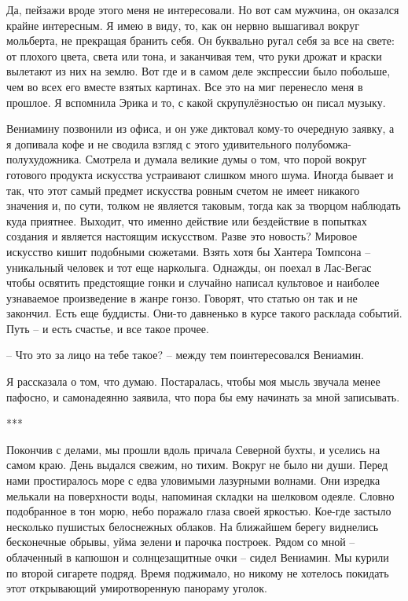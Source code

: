 \documentclass[
]{book}
\begin{document}
Да, пейзажи вроде этого меня не интересовали. Но вот сам мужчина, он оказался крайне интересным. Я имею в виду, то, как он нервно вышагивал вокруг мольберта, не прекращая бранить себя. Он буквально ругал себя за все на свете: от плохого цвета, света или тона, и заканчивая тем, что руки дрожат и краски вылетают из них на землю. Вот где и в самом деле экспрессии было побольше, чем во всех его вместе взятых картинах. Все это на миг перенесло меня в прошлое. Я вспомнила Эрика и то, с какой скрупулёзностью он писал музыку.

Вениамину позвонили из офиса, и он уже диктовал кому-то очередную заявку, а я допивала кофе и не сводила взгляд с этого удивительного полубомжа-полухудожника. Смотрела и думала великие думы о том, что порой вокруг готового продукта искусства устраивают слишком много шума. Иногда бывает и так, что этот самый предмет искусства ровным счетом не имеет никакого значения и, по сути, толком не является таковым, тогда как за творцом наблюдать куда приятнее. Выходит, что именно действие или бездействие в попытках создания и является настоящим искусством. Разве это новость? Мировое искусство кишит подобными сюжетами. Взять хотя бы Хантера Томпсона -- уникальный человек и тот еще нарколыга. Однажды, он поехал в Лас-Вегас чтобы освятить предстоящие гонки и случайно написал культовое и наиболее узнаваемое произведение в жанре гонзо. Говорят, что статью он так и не закончил. Есть еще буддисты. Они-то давненько в курсе такого расклада событий. Путь -- и есть счастье, и все такое прочее.

-- Что это за лицо на тебе такое? -- между тем поинтересовался Вениамин.

Я рассказала о том, что думаю. Постаралась, чтобы моя мысль звучала менее пафосно, и самонадеянно заявила, что пора бы ему начинать за мной записывать.

***

Покончив с делами, мы прошли вдоль причала Северной бухты, и уселись на самом краю. День выдался свежим, но тихим. Вокруг не было ни души. Перед нами простиралось море с едва уловимыми лазурными волнами. Они изредка мелькали на поверхности воды, напоминая складки на шелковом одеяле. Словно подобранное в тон морю, небо поражало глаза своей яркостью. Кое-где застыло несколько пушистых белоснежных облаков. На ближайшем берегу виднелись бесконечные обрывы, уйма зелени и парочка построек. Рядом со мной -- облаченный в капюшон и солнцезащитные очки -- сидел Вениамин. Мы курили по второй сигарете подряд. Время поджимало, но никому не хотелось покидать этот открывающий умиротворенную панораму уголок.
\end{document}
